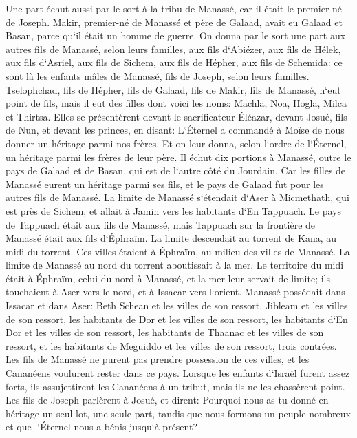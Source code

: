 \verse Une part échut aussi par le sort à la tribu de Manassé, car il était le premier-né de Joseph. Makir, premier-né de Manassé et père de Galaad, avait eu Galaad et Basan, parce qu`il était un homme de guerre. 
\verse On donna par le sort une part aux autres fils de Manassé, selon leurs familles, aux fils d`Abiézer, aux fils de Hélek, aux fils d`Asriel, aux fils de Sichem, aux fils de Hépher, aux fils de Schemida: ce sont là les enfants mâles de Manassé, fils de Joseph, selon leurs familles. 
\verse Tselophchad, fils de Hépher, fils de Galaad, fils de Makir, fils de Manassé, n`eut point de fils, mais il eut des filles dont voici les noms: Machla, Noa, Hogla, Milca et Thirtsa. 
\verse Elles se présentèrent devant le sacrificateur Éléazar, devant Josué, fils de Nun, et devant les princes, en disant: L`Éternel a commandé à Moïse de nous donner un héritage parmi nos frères. Et on leur donna, selon l`ordre de l`Éternel, un héritage parmi les frères de leur père. 
\verse Il échut dix portions à Manassé, outre le pays de Galaad et de Basan, qui est de l`autre côté du Jourdain. 
\verse Car les filles de Manassé eurent un héritage parmi ses fils, et le pays de Galaad fut pour les autres fils de Manassé. 
\verse La limite de Manassé s`étendait d`Aser à Micmethath, qui est près de Sichem, et allait à Jamin vers les habitants d`En Tappuach. 
\verse Le pays de Tappuach était aux fils de Manassé, mais Tappuach sur la frontière de Manassé était aux fils d`Éphraïm. 
\verse La limite descendait au torrent de Kana, au midi du torrent. Ces villes étaient à Éphraïm, au milieu des villes de Manassé. La limite de Manassé au nord du torrent aboutissait à la mer. 
\verse Le territoire du midi était à Éphraïm, celui du nord à Manassé, et la mer leur servait de limite; ils touchaient à Aser vers le nord, et à Issacar vers l`orient. 
\verse Manassé possédait dans Issacar et dans Aser: Beth Schean et les villes de son ressort, Jibleam et les villes de son ressort, les habitants de Dor et les villes de son ressort, les habitants d`En Dor et les villes de son ressort, les habitants de Thaanac et les villes de son ressort, et les habitants de Meguiddo et les villes de son ressort, trois contrées. 
\verse Les fils de Manassé ne purent pas prendre possession de ces villes, et les Cananéens voulurent rester dans ce pays. 
\verse Lorsque les enfants d`Israël furent assez forts, ils assujettirent les Cananéens à un tribut, mais ils ne les chassèrent point. 
\verse Les fils de Joseph parlèrent à Josué, et dirent: Pourquoi nous as-tu donné en héritage un seul lot, une seule part, tandis que nous formons un peuple nombreux et que l`Éternel nous a bénis jusqu`à présent? 

